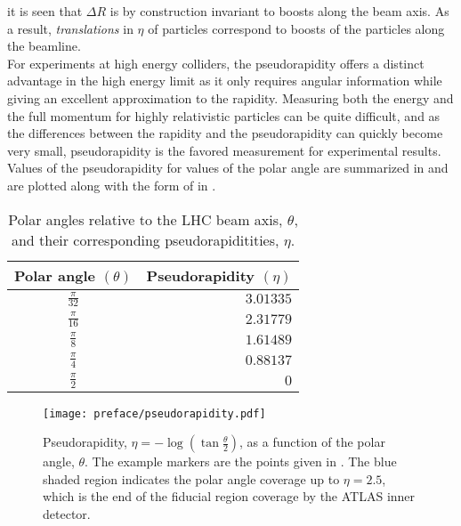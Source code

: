 it is seen that $\Delta R$ is by construction invariant to boosts along the beam axis.
As a result, \emph{translations} in $\eta$ of particles correspond to \glspl{boost} of the particles along the beamline.\\

For experiments at high energy colliders, the pseudorapidity offers a distinct advantage in the high energy limit as it only requires angular information while giving an excellent approximation to the rapidity.
Measuring both the energy and the full momentum for highly relativistic particles can be quite difficult, and as the differences between the rapidity and the pseudorapidity can quickly become very small, pseudorapidity is the favored measurement for experimental results.
Values of the pseudorapidity for values of the polar angle are summarized in  and are plotted along with the form of  in .

\begin{table}[htpb]
 \centering
 \caption{Polar angles relative to the LHC beam axis, $\theta$, and their corresponding pseudorapiditities, $\eta$.}
 \begin{tabular}{@{}cr@{}} \toprule
  Polar angle $(\theta)$ & Pseudorapidity $(\eta)$ \\ \midrule
  $\frac{\pi}{32}$       & $3.01335$               \\
  $\frac{\pi}{16}$       & $2.31779$               \\
  $\frac{\pi}{8}$        & $1.61489$               \\
  $\frac{\pi}{4}$        & $0.88137$               \\
  $\frac{\pi}{2}$        & $0$                     \\
  \bottomrule
 \end{tabular}\label{table:pseudorapidity_angles}%
\end{table}

\begin{figure}[htbp]
 \centering
 \texttt{[image: preface/pseudorapidity.pdf]}
 \caption{Pseudorapidity, $\eta = - \log \left(\tan \frac{\theta}{2}\right)$, as a function of the polar angle, $\theta$.
  The example markers are the points given in .
  The blue shaded region indicates the polar angle coverage up to $\eta = 2.5$, which is the end of the fiducial region coverage by the ATLAS inner detector.}
 \label{fig:pseudorapidity_angles}
\end{figure}

